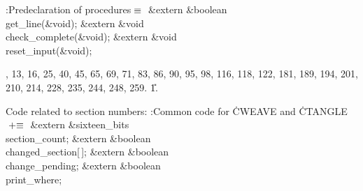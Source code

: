 \B{}:Predeclaration of procedures\X${}\equiv{}$\6
\&{extern} \&{boolean} \\{get\_line}(\&{void});\6
\&{extern} \&{void} \\{check\_complete}(\&{void});\6
\&{extern} \&{void} \\{reset\_input}(\&{void});\par
{}, 13, 16, 25, 40, 45, 65, 69, 71, 83, 86, 90, 95, 98, 116, 118, 122, 181,
189, 194, 201, 210, 214, 228, 235, 244, 248, 259.
\U1.\fi

Code related to section numbers:
\Y\B\4:Common code for \.{CWEAVE} and \.{CTANGLE}\X${}\mathrel+\equiv{}$\6
\&{extern} \&{sixteen\_bits} \\{section\_count};\6
\&{extern} \&{boolean} \\{changed\_section}[\,];\6
\&{extern} \&{boolean} \\{change\_pending};\6
\&{extern} \&{boolean} \\{print\_where};\par
\fi

